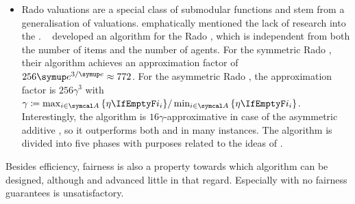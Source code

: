 \begin{itemize}
		\item
	Rado valuations are a special class of submodular functions and stem from a generalisation of \OXS{} valuations.
	 emphatically mentioned the lack of research into the \OXS{} \NSW.
	~\cite{approximating_nsw_under_rado_valuations} developed an algorithm for the Rado \NSW, which is independent from both the number of items and the number of agents.
	For the symmetric Rado \NSW, their algorithm achieves an approximation factor of \(256 \euler^{3/\euler} \approx 772\).
	For the asymmetric Rado \NSW, the approximation factor is \(256 \gamma^3\) with \(\gamma \coloneq \max_{i \in \agents} \,\braces{\weight} / \min_{i \in \agents} \,\braces{\weight}\).
	Interestingly, the algorithm is \(16 \gamma\)-approximative in case of the asymmetric additive \NSW, so it outperforms both \SMatch{} and \RepReMatch{} in many instances.
	The algorithm is divided into five phases with purposes related to the ideas of \RepReMatch.
\end{itemize}
Besides efficiency, fairness is also a property towards which algorithm can be designed, although \SMatch{} and \RepReMatch{} advanced little in that regard.
Especially \RepReMatch{} with no fairness guarantees is unsatisfactory.
%
%

